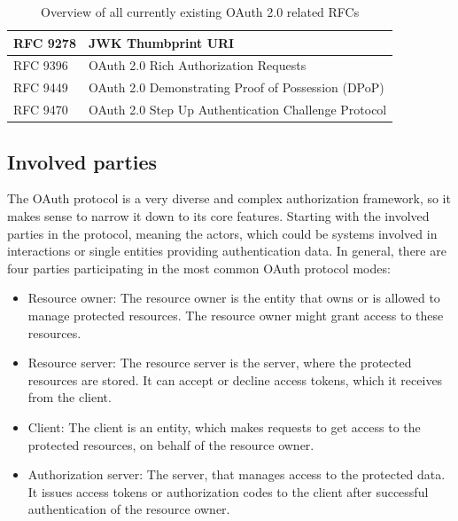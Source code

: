 \begin{table}[H]
{\begin{tabular}{@{}ll@{}}
	\multicolumn{1}{|l|}{RFC 9278} & \multicolumn{1}{l|}{JWK Thumbprint URI}                                                             \\ \midrule
	\multicolumn{1}{|l|}{RFC 9396} & \multicolumn{1}{l|}{OAuth 2.0 Rich Authorization Requests}                                          \\ \midrule
	\multicolumn{1}{|l|}{RFC 9449} & \multicolumn{1}{l|}{OAuth 2.0 Demonstrating Proof of Possession (DPoP)}                             \\ \midrule
	\multicolumn{1}{|l|}{RFC 9470} & \multicolumn{1}{l|}{OAuth 2.0 Step Up Authentication Challenge Protocol}                            \\ \bottomrule
	\end{tabular}%
	}
	\caption{Overview of all currently existing OAuth 2.0 related  RFCs}
	\label{tab:OAuthRFC}
\end{table}


\subsection{Involved parties}
The OAuth protocol is a very diverse and complex authorization framework, so it makes sense to narrow it down to its core
features. Starting with the involved parties in the protocol, meaning the actors, which could be systems involved in interactions or single entities providing authentication data. In general, there
are four parties participating in the most common OAuth protocol modes:

\begin{itemize} 

    \item Resource owner: The resource owner is the entity that owns or is allowed to manage protected resources. The resource owner might grant access to these resources. 

    \item Resource server: The resource server is the server, where the protected resources are stored. It can accept or decline access tokens, which it receives from the client. 

    \item Client: The client is an entity, which makes requests to get access to the protected resources, on behalf of the resource owner. 
        
    \item Authorization server: The server, that manages access to the protected data. It issues access tokens or authorization codes to the client after successful authentication of the resource owner. 

\end{itemize}

